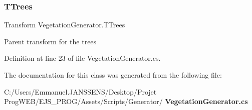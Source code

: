 \subsubsection{T\+Trees}
{\footnotesize\ttfamily Transform Vegetation\+Generator.\+T\+Trees}



Parent transform for the trees 



Definition at line 23 of file Vegetation\+Generator.\+cs.



The documentation for this class was generated from the following file\+:\begin{DoxyCompactItemize}
\item 
C\+:/\+Users/\+Emmanuel.\+J\+A\+N\+S\+S\+E\+N\+S/\+Desktop/\+Projet Prog\+W\+E\+B/\+E\+J\+S\+\_\+\+P\+R\+O\+G/\+Assets/\+Scripts/\+Generator/\textbf{ Vegetation\+Generator.\+cs}\end{DoxyCompactItemize}

